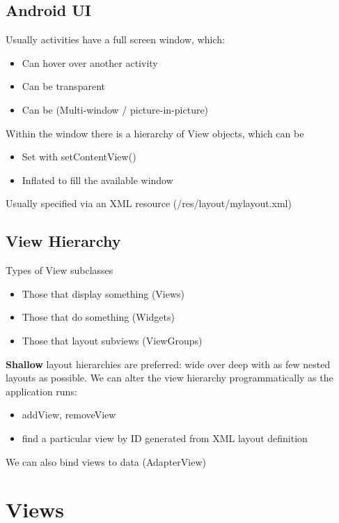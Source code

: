 \documentclass{article}
\begin{document}
\begin{multicols}{2}

\subsection{Android UI}

Usually activities have a full screen window, which:
\begin{itemize}
  \item Can hover over another activity 
  \item Can be transparent
  \item Can be (Multi-window / picture-in-picture)
\end{itemize}
Within the window there is a hierarchy of View objects, which can be
\begin{itemize}
  \item Set with setContentView() 
  \item Inflated to fill the available window
\end{itemize}
Usually specified via an XML resource (/res/layout/mylayout.xml)

\subsection{View	Hierarchy}

Types	of	View	subclasses
\begin{itemize}
  \item Those	that	display	something	(Views)
  \item Those	that	do	something	(Widgets)
  \item Those	that	layout	subviews (ViewGroups)
\end{itemize}
\textbf{Shallow} layout hierarchies are	preferred: wide over deep with as few nested layouts as possible. We can	alter	the	view	hierarchy	programmatically as	the	application	runs:
\begin{itemize}
  \item addView, removeView
  \item find a particular view by ID generated from XML layout definition
\end{itemize}
We can also bind views to data (AdapterView)
\end{multicols}

\section{Views}
\end{document}
